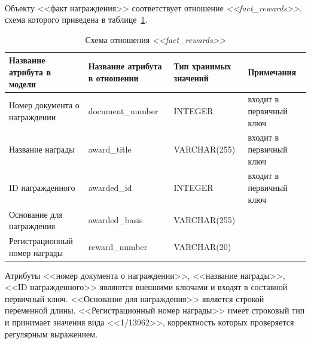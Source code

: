 \paragraph{}
Объекту <<факт награждения>> соответствует отношение \textit{<<fact\_rewards>>},
схема которого приведена в таблице~\ref{tbl:fact_rewards_scheme}.

\begin{table}[h!]
  \caption{Схема отношения \textit{<<fact\_rewards>>}}
  \label{tbl:fact_rewards_scheme}
  \small{
    \centering
    \begin{tabular}{| p{} | p{} | p{} | p{} |}
      \hline
      Название атрибута \newline в модели &
      Название атрибута \newline в отношении &
      Тип хранимых \newline значений &
      Примечания \\ \hline

      Номер документа \newline о награждении &
      document\_number &
      INTEGER &
      входит в первичный ключ \\
      \hline

      Название награды &
      award\_title &
      VARCHAR(255) &
      входит в первичный ключ \\
      \hline

      ID награжденного &
      awarded\_id &
      INTEGER &
      входит в первичный ключ \\
      \hline

      Основание \newline для награждения &
      awarded\_basis &
      VARCHAR(255) & \\
      \hline

      Регистрационный \newline номер награды &
      reward\_number &
      VARCHAR(20) & \\
      \hline

    \end{tabular}
  }
\end{table}

Атрибуты <<номер документа о награждении>>, <<название награды>>,
<<ID награжденного>> являются внешними ключами и входят в составной 
первичный ключ.
<<Основание для награждения>> является строкой переменной длины.
<<Регистрационный номер награды>> имеет строковый тип и принимает значения вида
<<1/13962>>, корректность которых проверяется регулярным выражением.


